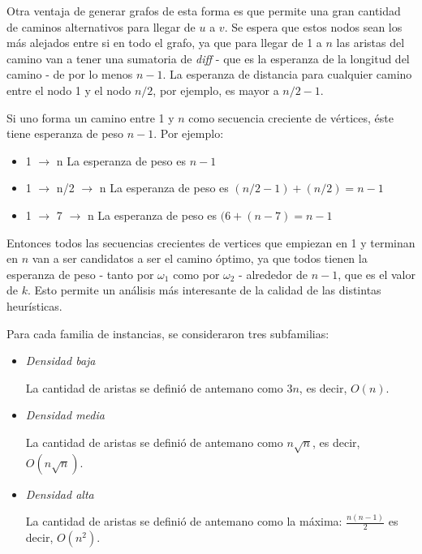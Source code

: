 Otra ventaja de generar grafos de esta forma es que permite una gran cantidad de caminos alternativos para llegar de $u$ a $v$. Se espera que estos nodos sean los más alejados entre si en todo el grafo, ya que para llegar de 1 a $n$ las aristas del camino van a tener una sumatoria de \textit{diff} - que es la esperanza de la longitud del camino - de por lo menos $n-1$. La esperanza de distancia para cualquier camino entre el nodo 1 y el nodo $n/2$, por ejemplo, es mayor a $n/2 - 1$.

Si uno forma un camino entre 1 y $n$ como secuencia creciente de vértices, éste tiene esperanza de peso $n-1$. Por ejemplo:
\begin{itemize}
    \item 1 $\rightarrow$ n     \hspace{2cm}La esperanza de peso es $n-1$
    \item 1 $\rightarrow$ n/2 $\rightarrow$ n   \hspace{0.5cm}     La esperanza de peso es $(n/2 -1) + (n/2) = n-1$
    \item 1 $\rightarrow$ 7 $\rightarrow$ n    \hspace{1cm}    La esperanza de peso es $(6 + (n - 7) = n-1$
\end{itemize}

Entonces todos las secuencias crecientes de vertices que empiezan en 1 y terminan en $n$ van a ser candidatos a ser el camino óptimo, ya que todos tienen la esperanza de peso - tanto por $\omega_1$ como por $\omega_2$ - alrededor de $n-1$, que es el valor de $k$. Esto permite un análisis más interesante de la calidad de las distintas heurísticas.

\newpage
Para cada familia de instancias, se consideraron tres subfamilias:

\begin{itemize}
    \item \textit{Densidad baja}

    La cantidad de aristas se definió de antemano como $3n$, es decir, $O(n)$.
    \item \textit{Densidad media}

    La cantidad de aristas se definió de antemano como $n\sqrt{n}$, es decir, $O(n\sqrt{n})$.
    \item \textit{Densidad alta}

    La cantidad de aristas se definió de antemano como la máxima: $\frac{n(n-1)}{2}$ es decir, $O(n^2)$.
\end{itemize}
